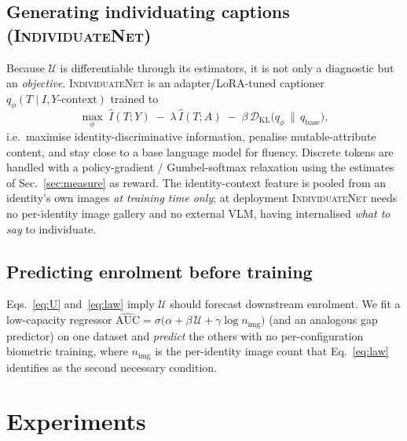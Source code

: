 \documentclass[10pt,twocolumn,letterpaper]{article}
\newcommand{\U}{\mathcal{U}}
\newcommand{\method}{\textsc{IndividuateNet}}
\begin{document}
\subsection{Generating individuating captions (\method)}
\label{sec:generator}
Because $\U$ is differentiable through its estimators, it is not only a diagnostic but an
\emph{objective}. \method{} is an adapter/LoRA-tuned captioner $q_\phi(T\mid I,Y\text{-context})$
trained to
\begin{equation}
  \max_{\phi}\; \hat I(T;Y)\;-\;\lambda\,\hat I(T;A)\;-\;\beta\,\mathcal{D}_{\text{KL}}\!\big(q_\phi\,\|\,q_{\text{base}}\big),
  \label{eq:gen}
\end{equation}
i.e.\ maximise identity-discriminative information, penalise mutable-attribute content, and stay
close to a base language model for fluency. Discrete tokens are handled with a policy-gradient /
Gumbel-softmax relaxation using the estimates of Sec.~\ref{sec:measure} as reward. The
identity-context feature is pooled from an identity's own images \emph{at training time only};
at deployment \method{} needs no per-identity image gallery and no external VLM, having
internalised \emph{what to say} to individuate.

\subsection{Predicting enrolment before training}
\label{sec:predictor}
Eqs.~\ref{eq:U} and~\ref{eq:law} imply $\U$ should forecast downstream enrolment. We fit a
low-capacity regressor
$\widehat{\mathrm{AUC}}=\sigma\!\big(\alpha+\beta\,\U+\gamma\log n_{\text{img}}\big)$ (and an
analogous gap predictor) on one dataset and \emph{predict} the others with no per-configuration
biometric training, where $n_{\text{img}}$ is the per-identity image count that Eq.~\ref{eq:law}
identifies as the second necessary condition.

\section{Experiments}
\label{sec:exp}
\end{document}
